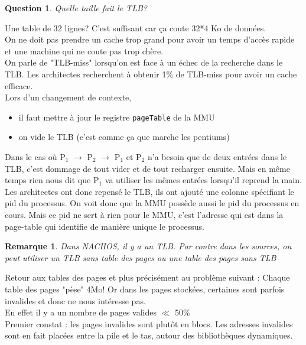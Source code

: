 \documentclass[12pt,a4paper]{report}
\newtheorem*{rem}{Remarque}
\newtheorem*{q}{Question}
\begin{document}
\begin{q}Quelle taille fait le TLB?\end{q}
Une table de 32 lignes? C'est suffisant car ça coute 32*4 Ko de données.\\
On ne doit pas prendre un cache trop grand pour avoir un temps d'accès rapide et une machine qui ne coute pas trop chère.\\
On parle de "TLB-miss" lorsqu’on est face à un échec de la recherche dans le TLB. Les architectes recherchent à obtenir 1\% de TLB-miss pour avoir un cache efficace.\\

Lors d'un changement de contexte, 
\begin{itemize}
\item il faut mettre à jour le registre \verb?pageTable? de la MMU
\item on vide le TLB (c'est comme ça que marche les pentiums)
\end{itemize}

Dans le cas où P$_1$ $\rightarrow$ P$_2$ $\rightarrow$ P$_1$ et P$_2$ n'a besoin que de deux entrées dans le TLB, c'est dommage de tout vider et de tout recharger ensuite. Mais en même temps rien nous dit que P$_1$ va utiliser les mêmes entrées lorsqu'il reprend la main.\\

Les architectes ont donc repensé le TLB, ils ont ajouté une colonne spécifiant le pid du processus. On voit donc que la MMU possède aussi le pid du processus en cours. Mais ce pid ne sert à rien pour le MMU, c'est l'adresse qui est dans la page-table qui identifie de manière unique le processus.\\

\begin{rem} Dans NACHOS, il y a un TLB. Par contre dans les sources, on peut utiliser un TLB sans table des pages ou une table des pages sans TLB \end{rem}

Retour aux tables des pages et plus précisément au problème suivant : Chaque table des pages "pèse" 4Mo! Or dans les pages stockées, certaines sont parfois invalides et donc ne nous intéresse pas.\\
En effet il y a un nombre de pages valides $\ll$ 50\%\\


Premier constat : les pages invalides sont plutôt en blocs. Les adresses invalides sont en fait placées entre la pile et le tas, autour des bibliothèques dynamiques.
\end{document}
